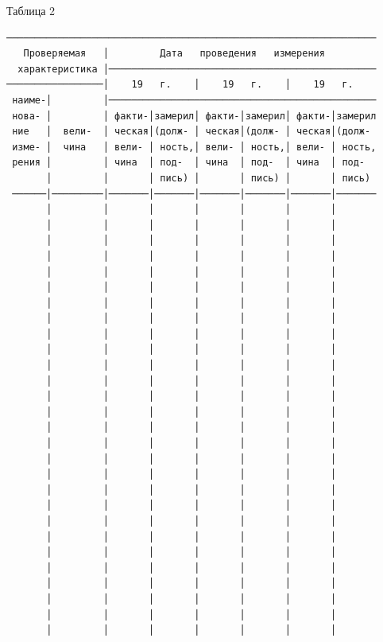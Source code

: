 \documentclass[11pt,a4paper]{article}
\begin{document}
\begin{flushright}\small Таблица 2\end{flushright}
\begin{center}\small
\begin{BVerbatim}
─────────────────────────────────────────────────────────────────
   Проверяемая   │         Дата   проведения   измерения
  характеристика │───────────────────────────────────────────────
─────────────────│    19   г.    │    19   г.    │    19   г.
 наиме-│         │───────────────────────────────────────────────
 нова- │         │ факти-│замерил│ факти-│замерил│ факти-│замерил
 ние   │  вели-  │ ческая│(долж- │ ческая│(долж- │ ческая│(долж-
 изме- │  чина   │ вели- │ ность,│ вели- │ ность,│ вели- │ ность,
 рения │         │ чина  │ под-  │ чина  │ под-  │ чина  │ под-
       │         │       │ пись) │       │ пись) │       │ пись)
 ──────│─────────│───────│───────│───────│───────│───────│───────
       │         │       │       │       │       │       │
       │         │       │       │       │       │       │
       │         │       │       │       │       │       │
       │         │       │       │       │       │       │
       │         │       │       │       │       │       │
       │         │       │       │       │       │       │
       │         │       │       │       │       │       │
       │         │       │       │       │       │       │
       │         │       │       │       │       │       │
       │         │       │       │       │       │       │
       │         │       │       │       │       │       │
       │         │       │       │       │       │       │
       │         │       │       │       │       │       │
       │         │       │       │       │       │       │
       │         │       │       │       │       │       │
       │         │       │       │       │       │       │
       │         │       │       │       │       │       │
       │         │       │       │       │       │       │
       │         │       │       │       │       │       │
       │         │       │       │       │       │       │
       │         │       │       │       │       │       │
       │         │       │       │       │       │       │
       │         │       │       │       │       │       │
       │         │       │       │       │       │       │
       │         │       │       │       │       │       │
       │         │       │       │       │       │       │
       │         │       │       │       │       │       │
       │         │       │       │       │       │       │

\end{BVerbatim}
\end{center}
\end{document}
